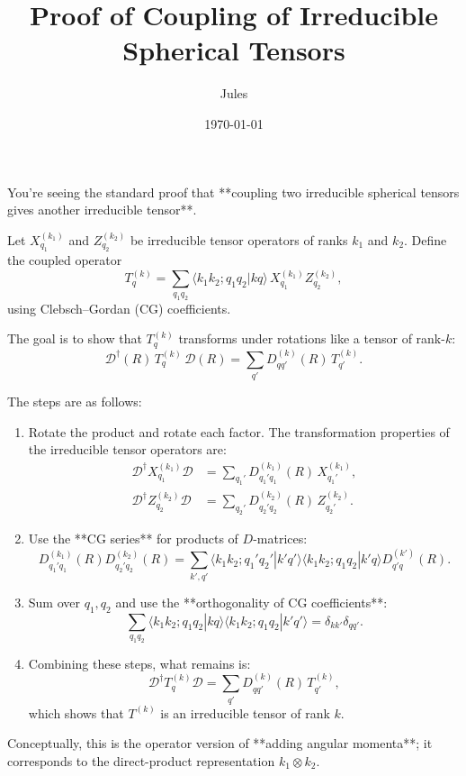 \documentclass[12pt]{article}
\title{Proof of Coupling of Irreducible Spherical Tensors}
\author{Jules}
\date{\today}
\begin{document}
\maketitle

You’re seeing the standard proof that **coupling two irreducible spherical tensors gives another irreducible tensor**.

Let $X^{(k_1)}_{q_1}$ and $Z^{(k_2)}_{q_2}$ be irreducible tensor operators of ranks $k_1$ and $k_2$. Define the coupled operator
\begin{equation}
T^{(k)}_q = \sum_{q_1 q_2} \langle k_1 k_2; q_1 q_2 | k q\rangle\, X^{(k_1)}_{q_1} Z^{(k_2)}_{q_2},
\end{equation}
using Clebsch–Gordan (CG) coefficients.

The goal is to show that $T^{(k)}_q$ transforms under rotations like a tensor of rank-$k$:
\begin{equation}
\mathcal D^\dagger(R)\,T^{(k)}_q\,\mathcal D(R)=\sum_{q'} D^{(k)}_{q q'}(R)\,T^{(k)}_{q'}.
\end{equation}

The steps are as follows:

\begin{enumerate}
    \item Rotate the product and rotate each factor. The transformation properties of the irreducible tensor operators are:
    \begin{align}
    \mathcal D^\dagger X^{(k_1)}_{q_1}\mathcal D &= \sum_{q_1'} D^{(k_1)}_{q_1' q_1}(R)\,X^{(k_1)}_{q_1'}, \\
    \mathcal D^\dagger Z^{(k_2)}_{q_2}\mathcal D &= \sum_{q_2'} D^{(k_2)}_{q_2' q_2}(R)\,Z^{(k_2)}_{q_2'}.
    \end{align}

    \item Use the **CG series** for products of $D$-matrices:
    \begin{equation}
    D^{(k_1)}_{q_1' q_1}(R) D^{(k_2)}_{q_2' q_2}(R)
    = \sum_{k',q'} \langle k_1 k_2; q_1' q_2'|k' q'\rangle
    \langle k_1 k_2; q_1 q_2|k' q\rangle
    D^{(k')}_{q' q}(R).
    \end{equation}

    \item Sum over $q_1,q_2$ and use the **orthogonality of CG coefficients**:
    \begin{equation}
    \sum_{q_1 q_2}\langle k_1 k_2; q_1 q_2|k q\rangle
    \langle k_1 k_2; q_1 q_2|k' q'\rangle
    =\delta_{k k'}\delta_{q q'}.
    \end{equation}

    \item Combining these steps, what remains is:
    \begin{equation}
    \mathcal D^\dagger T^{(k)}_q \mathcal D=\sum_{q'} D^{(k)}_{q q'}(R)\,T^{(k)}_{q'},
    \end{equation}
    which shows that $T^{(k)}$ is an irreducible tensor of rank $k$.
\end{enumerate}

Conceptually, this is the operator version of **adding angular momenta**; it corresponds to the direct-product representation $k_1\otimes k_2$.
\end{document}
